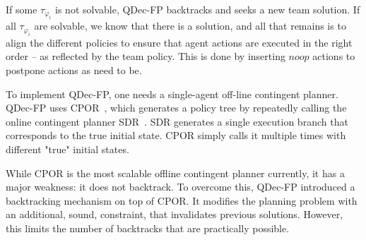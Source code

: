 \documentclass[letterpaper]{article} %
\theoremstyle{definition}
\begin{document}
If some $\tau_{\varphi_i}$ is not solvable, QDec-FP backtracks and seeks a new team solution.
If all $\tau_{\varphi_i}$ are solvable, we know that there is a solution, and all that remains is to align the different policies to ensure that agent actions are executed in the right order -- as reflected by the team policy. This is done by inserting $noop$ actions to postpone actions as need to be.

To implement QDec-FP,
one needs a single-agent off-line contingent planner.
QDec-FP uses CPOR~\citep{CPOR}, which generates a policy tree by repeatedly calling the online contingent planner SDR~\citep{SDR}. SDR generates a single execution branch that corresponds to the true initial state. CPOR
simply calls it multiple times with different "true" initial states.

While CPOR is the most scalable offline contingent planner currently, it has a major weakness: it does not backtrack.
To overcome this, QDec-FP introduced a backtracking mechanism on top of CPOR. It modifies the planning problem with an additional, sound, constraint, that invalidates
previous solutions.
However, this limits the number of backtracks that are practically possible.
%


\end{document}
